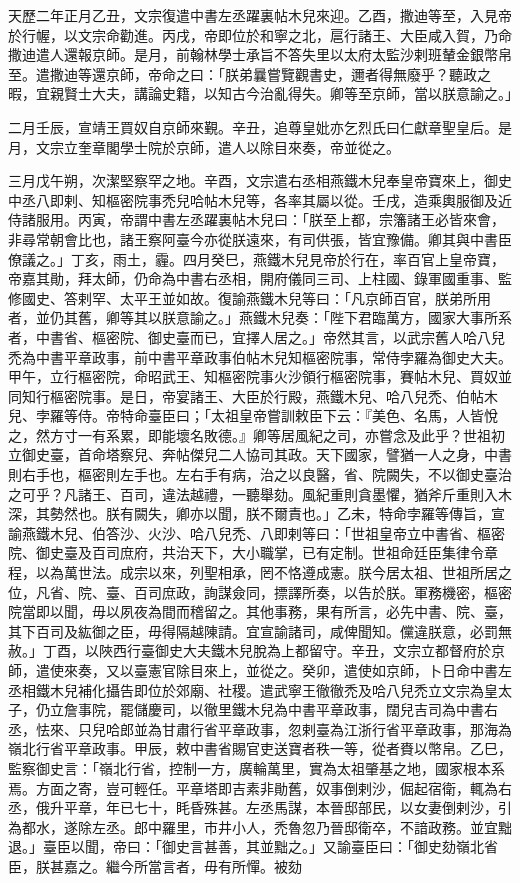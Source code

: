 \begin{pinyinscope}
 天歷二年正月乙丑，文宗復遣中書左丞躍裏帖木兒來迎。乙酉，撒迪等至，入見帝於行幄，以文宗命勸進。丙戌，帝即位於和寧之北，扈行諸王、大臣咸入賀，乃命撒迪遣人還報京師。是月，前翰林學士承旨不答失里以太府太監沙剌班輦金銀幣帛至。遣撒迪等還京師，帝命之曰：「朕弟曩嘗覽觀書史，邇者得無廢乎？聽政之暇，宜親賢士大夫，講論史籍，以知古今治亂得失。卿等至京師，當以朕意諭之。」



 二月壬辰，宣靖王買奴自京師來覲。辛丑，追尊皇妣亦乞烈氏曰仁獻章聖皇后。是月，文宗立奎章閣學士院於京師，遣人以除目來奏，帝並從之。



 三月戊午朔，次潔堅察罕之地。辛酉，文宗遣右丞相燕鐵木兒奉皇帝寶來上，御史中丞八即剌、知樞密院事禿兒哈帖木兒等，各率其屬以從。壬戌，造乘輿服御及近侍諸服用。丙寅，帝謂中書左丞躍裏帖木兒曰：「朕至上都，宗籓諸王必皆來會，非尋常朝會比也，諸王察阿臺今亦從朕遠來，有司供張，皆宜豫備。卿其與中書臣僚議之。」丁亥，雨土，霾。四月癸巳，燕鐵木兒見帝於行在，率百官上皇帝寶，帝嘉其勛，拜太師，仍命為中書右丞相，開府儀同三司、上柱國、錄軍國重事、監修國史、答剌罕、太平王並如故。復諭燕鐵木兒等曰：「凡京師百官，朕弟所用者，並仍其舊，卿等其以朕意諭之。」燕鐵木兒奏：「陛下君臨萬方，國家大事所系者，中書省、樞密院、御史臺而已，宜擇人居之。」帝然其言，以武宗舊人哈八兒禿為中書平章政事，前中書平章政事伯帖木兒知樞密院事，常侍孛羅為御史大夫。甲午，立行樞密院，命昭武王、知樞密院事火沙領行樞密院事，賽帖木兒、買奴並同知行樞密院事。是日，帝宴諸王、大臣於行殿，燕鐵木兒、哈八兒禿、伯帖木兒、孛羅等侍。帝特命臺臣曰；「太祖皇帝嘗訓敕臣下云：『美色、名馬，人皆悅之，然方寸一有系累，即能壞名敗德。』卿等居風紀之司，亦嘗念及此乎？世祖初立御史臺，首命塔察兒、奔帖傑兒二人協司其政。天下國家，譬猶一人之身，中書則右手也，樞密則左手也。左右手有病，治之以良醫，省、院闕失，不以御史臺治之可乎？凡諸王、百司，違法越禮，一聽舉劾。風紀重則貪墨懼，猶斧斤重則入木深，其勢然也。朕有闕失，卿亦以聞，朕不爾責也。」乙未，特命孛羅等傳旨，宣諭燕鐵木兒、伯答沙、火沙、哈八兒禿、八即剌等曰：「世祖皇帝立中書省、樞密院、御史臺及百司庶府，共治天下，大小職掌，已有定制。世祖命廷臣集律令章程，以為萬世法。成宗以來，列聖相承，罔不恪遵成憲。朕今居太祖、世祖所居之位，凡省、院、臺、百司庶政，詢謀僉同，摽譯所奏，以告於朕。軍務機密，樞密院當即以聞，毋以夙夜為間而稽留之。其他事務，果有所言，必先中書、院、臺，其下百司及紘御之臣，毋得隔越陳請。宜宣諭諸司，咸俾聞知。儻違朕意，必罰無赦。」丁酉，以陜西行臺御史大夫鐵木兒脫為上都留守。辛丑，文宗立都督府於京師，遣使來奏，又以臺憲官除目來上，並從之。癸卯，遣使如京師，卜日命中書左丞相鐵木兒補化攝告即位於郊廟、社稷。遣武寧王徹徹禿及哈八兒禿立文宗為皇太子，仍立詹事院，罷儲慶司，以徹里鐵木兒為中書平章政事，闊兒吉司為中書右丞，怯來、只兒哈郎並為甘肅行省平章政事，忽剌臺為江浙行省平章政事，那海為嶺北行省平章政事。甲辰，敕中書省賜官吏送寶者秩一等，從者賚以幣帛。乙巳，監察御史言：「嶺北行省，控制一方，廣輪萬里，實為太祖肇基之地，國家根本系焉。方面之寄，豈可輕任。平章塔即吉素非勛舊，奴事倒剌沙，倔起宿衛，輒為右丞，俄升平章，年已七十，眊昏殊甚。左丞馬謀，本晉邸部民，以女妻倒剌沙，引為都水，遂除左丞。郎中羅里，市井小人，禿魯忽乃晉邸衛卒，不諳政務。並宜黜退。」臺臣以聞，帝曰：「御史言甚善，其並黜之。」又諭臺臣曰：「御史劾嶺北省臣，朕甚嘉之。繼今所當言者，毋有所憚。被劾
\end{pinyinscope}
